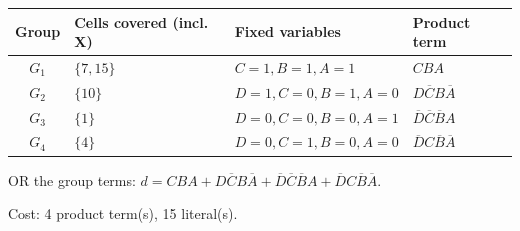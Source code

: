 \documentclass[a4paper,11pt]{article}
\begin{document}
\begin{minipage}{\textwidth}
\begin{center}\small
\begin{tabular}{clll}
\toprule
Group & Cells covered (incl. X) & Fixed variables & Product term\\\midrule
\textcolor{blue!75!black}{$G_{1}$} & $\{7,15\}$ & $C=1,B=1,A=1$ & $CBA$\\
\textcolor{red!75!black}{$G_{2}$} & $\{10\}$ & $D=1,C=0,B=1,A=0$ & $D\overline{C}B\overline{A}$\\
\textcolor{teal!80!black}{$G_{3}$} & $\{1\}$ & $D=0,C=0,B=0,A=1$ & $\overline{D}\overline{C}\overline{B}A$\\
\textcolor{violet!85!black}{$G_{4}$} & $\{4\}$ & $D=0,C=1,B=0,A=0$ & $\overline{D}C\overline{B}\overline{A}$\\
\bottomrule\end{tabular}\end{center}


\noindent OR the group terms: $\boxed{d=CBA + D\overline{C}B\overline{A} + \overline{D}\overline{C}\overline{B}A + \overline{D}C\overline{B}\overline{A}}$.

\noindent Cost: 4 product term(s), 15 literal(s).

\end{minipage}\par\vspace{0.25cm}

\clearpage
\end{document}

